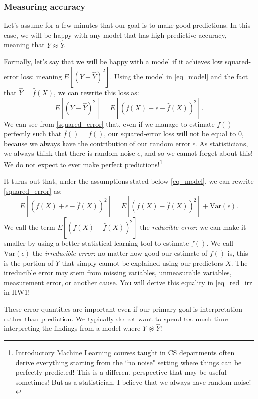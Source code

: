 \documentclass[titlepage,10pt]{scrartcl}
\begin{document}
\subsubsection{Measuring accuracy}

Let's assume for a few minutes that our goal is to make good predictions. In this case, we will be happy with any model that has high predictive accuracy, meaning that $Y \approx \hat{Y}$. 

Formally, let's say that we will be happy with a model if it achieves low squared-error loss: meaning $E[(Y - \hat{Y})^2]$. Using the model in \eqref{eq_model} and the fact that $\hat{Y}= \hat{f}(X)$, we can rewrite this loss as: 
\begin{equation}
\label{squared_error}
E[(Y - \hat{Y})^2] =  	E\left[\left(f(X) + \epsilon - \hat{f}(X)\right)^2\right]. 
\end{equation}
We can see from \eqref{squared_error} that, even if we manage to estimate $f()$ perfectly such that $\hat{f}()=f()$, our squared-error loss will not be equal to $0$, because we always have the contribution of our random error $\epsilon$. As statisticians, we always think that there is random noise $\epsilon$, and so we cannot forget about this! We do not expect to ever make perfect predictions!\footnote{Introductory Machine Learning courses taught in CS departments often derive everything starting from the ``no noise" setting where things can be perfectly predicted! This is a different perspective that may be useful sometimes! But as a statistician, I believe that we always have random noise!}

It turns out that, under the assumptions stated below \eqref{eq_model}, we can rewrite \eqref{squared_error} as:
\begin{equation}
\label{eq_red_irr}
E\left[\left(f(X) + \epsilon - \hat{f}(X)\right)^2\right] = E\left[\left(f(X) - \hat{f}(X)\right)^2\right] + \mathrm{Var}\left(\epsilon\right).
\end{equation}
We call the term $E\left[\left(f(X) - \hat{f}(X)\right)^2\right]$ the \emph{reducible error}: we can make it smaller by using a better statistical learning tool to estimate $f()$. 
We call $\mathrm{Var}\left(\epsilon\right)$ the \emph{irreducible error}: no matter how good our estimate of $f()$ is, this is the portion of $Y$ that simply cannot be explained using our predictors $X$. The irreducible error may stem from missing variables, unmeasurable variables, measurement error, or another cause.  You will derive this equality in \eqref{eq_red_irr} in HW1! 

These error quantities are important even if our primary goal is interpretation rather than prediction. We typically do not want to spend too much time interpreting the findings from a model where $Y \not\approx \hat{Y}$! 
\end{document}
